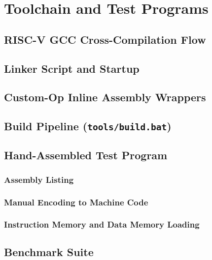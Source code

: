 \chapter{Toolchain and Test Programs}
\label{ch:toolchain}

\section{RISC-V GCC Cross-Compilation Flow}

\section{Linker Script and Startup}

\section{Custom-Op Inline Assembly Wrappers}

\section{Build Pipeline (\texttt{tools/build.bat})}

\section{Hand-Assembled Test Program}
\subsection{Assembly Listing}
\subsection{Manual Encoding to Machine Code}
\subsection{Instruction Memory and Data Memory Loading}

\section{Benchmark Suite}
